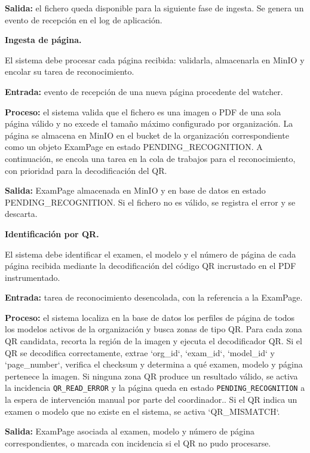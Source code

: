 \begin{functional}
\begin{functional}
    \textbf{Salida:} el fichero queda disponible para la siguiente fase de ingesta. Se genera un evento de recepción en el log de aplicación.

    \item \textbf{Ingesta de página.}

    El sistema debe procesar cada página recibida: validarla, almacenarla en MinIO y encolar su tarea de reconocimiento.

    \textbf{Entrada:} evento de recepción de una nueva página procedente del watcher.

    \textbf{Proceso:} el sistema valida que el fichero es una imagen o PDF de una sola página válido y no excede el tamaño máximo configurado por organización. La página se almacena en MinIO en el bucket de la organización correspondiente como un objeto ExamPage en estado PENDING\_RECOGNITION. A continuación, se encola una tarea en la cola de trabajos para el reconocimiento, con prioridad para la decodificación del QR.

    \textbf{Salida:} ExamPage almacenada en MinIO y en base de datos en estado PENDING\_RECOGNITION. Si el fichero no es válido, se registra el error y se descarta.

    \item \textbf{Identificación por QR.}

    El sistema debe identificar el examen, el modelo y el número de página de cada página recibida mediante la decodificación del código QR incrustado en el PDF instrumentado.

    \textbf{Entrada:} tarea de reconocimiento desencolada, con la referencia a la ExamPage.

    \textbf{Proceso:} el sistema localiza en la base de datos los perfiles de página de todos los modelos activos de la organización y busca zonas de tipo QR. Para cada zona QR candidata, recorta la región de la imagen y ejecuta el decodificador QR. Si el QR se decodifica correctamente, extrae `org\_id`, `exam\_id`, `model\_id` y `page\_number`, verifica el checksum y determina a qué examen, modelo y página pertenece la imagen. Si ninguna zona QR produce un resultado válido, se activa la incidencia \texttt{QR\_READ\_ERROR} y la página queda en estado \texttt{PENDING\_RECOGNITION} a la espera de intervención manual por parte del coordinador.. Si el QR indica un examen o modelo que no existe en el sistema, se activa `QR\_MISMATCH`.

    \textbf{Salida:} ExamPage asociada al examen, modelo y número de página correspondientes, o marcada con incidencia si el QR no pudo procesarse.


\end{functional}
\end{functional}
